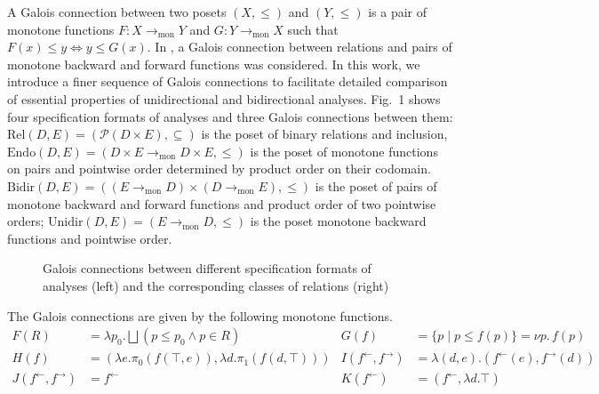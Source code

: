 \documentclass{easychair}
\theoremstyle{definition}
\newcommand{\Pow}{\mathcal{P}}
\newcommand{\Rel}{\mathrm{Rel}}
\newcommand{\Endo}{\mathrm{Endo}}
\newcommand{\Bidir}{\mathrm{Bidir}}
\newcommand{\Unidir}{\mathrm{Unidir}}
\newcommand{\tomon}{\to_{\mathrm{mon}}}
\newcommand{\ff}{{f^{\rightarrow}}}
\newcommand{\fb}{{f^{\leftarrow}}}
\newcommand{\bigjoin}{\bigsqcup}
\newcommand{\rotsubseteq}{\rotatebox[origin=c]{90}{$\subseteq$}}
\begin{document}
A Galois connection between two posets $(X , \leq)$ and $(Y , \leq)$ is a pair
of monotone functions $F : X \tomon Y$ and $G : Y \tomon X$ such that $F(x) \leq y \iff y \leq G(x)$.
In \cite{frade_bidirectional_2009}, a Galois connection between relations and pairs of monotone backward and forward functions was considered.
In this work, we introduce a finer sequence of
Galois connections to facilitate detailed comparison of essential properties
of unidirectional and bidirectional analyses. Fig.~1 shows four specification formats of analyses 
and three Galois connections between them: $\Rel(D, E)= (\Pow(D \times E), \subseteq)$
is the poset of binary relations and inclusion, $\Endo(D , E) = (D \times E \tomon D \times E, {\leq})$
is the poset of monotone functions on pairs and pointwise order determined
by product order on their codomain. $\Bidir(D , E) = ((E \tomon D) \times (D \tomon E), \leq)$ is the poset of pairs of monotone backward and forward functions and product
order of two pointwise orders; $\Unidir(D , E) = (E \tomon D, \leq)$ is the poset monotone backward functions and pointwise order.
\begin{figure}[htbp]
  \centering
  \label{fig:galois-connections}
  \caption{Galois connections between different specification formats of analyses (left) and the corresponding classes of relations (right)}
\end{figure}
The Galois connections are given by the following monotone functions.
\begin{align*}
  F(R) &= \lambda p_{0}. \bigjoin (p \leq p_{0} \land p \in R) &  G(f) &= \{ p \mid p \leq f(p) \} = \nu p.\, f(p)\\
  H(f) &= (\lambda e. \pi_0(f (\top , e)), \lambda d. \pi_1(f (d , \top))) & I(\fb, \ff) &= \lambda (d,e). (\fb (e), \ff (d)) \\
  J(\fb, \ff) &= \fb & K(\fb) &= (\fb , \lambda d. \top)
\end{align*}
\end{document}
